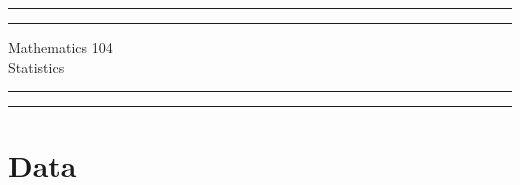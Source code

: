 \documentclass[12pt,oneside]{book}
\begin{document}
\begin{center}
	\vspace*{\baselineskip} %
	
	\rule{\textwidth}{1.6pt}\vspace*{-\baselineskip}\vspace*{2.5pt}
	\rule{\textwidth}{0.4pt}
	
	\vspace{0.75\baselineskip}
	
	{\huge Mathematics 104}\\
	Statistics\\ 
	\vspace{0.25\baselineskip}
	
	\rule{\textwidth}{0.4pt}\vspace*{-\baselineskip}\vspace{3.7pt} 
	\rule{\textwidth}{1.6pt} 
\end{center}
\pagestyle{empty}



\section*{Data}
\data
\end{document}
